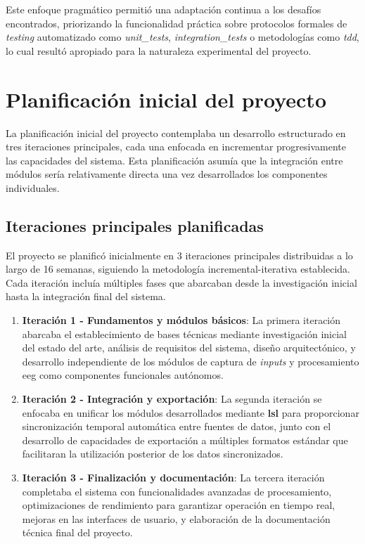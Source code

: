 Este enfoque pragmático permitió una adaptación continua a los desafíos encontrados, priorizando la funcionalidad práctica sobre protocolos formales de \textit{testing} automatizado como \textit{\glspl{unit_test}}, \textit{\glspl{integration_test}} o metodologías como \textit{\gls{tdd}}, lo cual resultó apropiado para la naturaleza experimental del proyecto.

\section{Planificación inicial del proyecto}
\label{sec:planificacion_inicial}

La planificación inicial del proyecto contemplaba un desarrollo estructurado en tres iteraciones principales, cada una enfocada en incrementar progresivamente las capacidades del sistema. Esta planificación asumía que la integración entre módulos sería relativamente directa una vez desarrollados los componentes individuales.

\subsection{Iteraciones principales planificadas}
\label{subsec:iteraciones_planificadas}

El proyecto se planificó inicialmente en 3 iteraciones principales distribuidas a lo largo de 16 semanas, siguiendo la metodología incremental-iterativa establecida. Cada iteración incluía múltiples fases que abarcaban desde la investigación inicial hasta la integración final del sistema.

\begin{enumerate}
    \item \textbf{Iteración 1 - Fundamentos y módulos básicos}: La primera iteración abarcaba el establecimiento de bases técnicas mediante investigación inicial del estado del arte, análisis de requisitos del sistema, diseño arquitectónico, y desarrollo independiente de los módulos de captura de \textit{inputs} y procesamiento \acrshort{eeg} como componentes funcionales autónomos.
    
    \item \textbf{Iteración 2 - Integración y exportación}: La segunda iteración se enfocaba en unificar los módulos desarrollados mediante \textbf{\acrshort{lsl}} para proporcionar sincronización temporal automática entre fuentes de datos, junto con el desarrollo de capacidades de exportación a múltiples formatos estándar que facilitaran la utilización posterior de los datos sincronizados.
    
    \item \textbf{Iteración 3 - Finalización y documentación}: La tercera iteración completaba el sistema con funcionalidades avanzadas de procesamiento, optimizaciones de rendimiento para garantizar operación en tiempo real, mejoras en las interfaces de usuario, y elaboración de la documentación técnica final del proyecto.
\end{enumerate}

